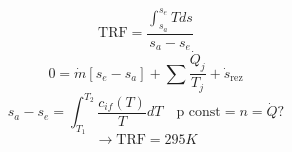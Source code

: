

\item[b)] 
    \[
    \text{TRF} = \frac{\int_{s_a}^{s_e} T ds}{s_a - s_e}
    \]
    \[
    0 = \dot{m} \left[ s_e - s_a \right] + \sum \frac{\dot{Q}_j}{T_j} + \dot{s}_{\text{rez}}
    \]
    \[
    s_a - s_e = \int_{T_1}^{T_2} \frac{c_{if}(T)}{T} dT \quad \text{p const} = n = \dot{Q}?
    \]
    \[
    \rightarrow \text{TRF} = 295 K
    \]
